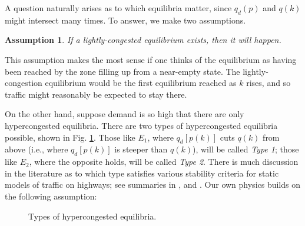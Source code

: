 \documentclass[preprint,authoryear]{elsarticle}
\newtheorem{assumption}{Assumption}
\begin{document}
A question naturally arises as to which equilibria matter, since $q_d(p)$ and $q(k)$ might intersect many times. To answer, we make two assumptions.
\begin{assumption}\label{ass:light-congestion}
If a lightly-congested equilibrium exists, then it will happen.
\end{assumption}
This assumption makes the most sense if one thinks of the equilibrium as having been reached by the zone filling up from a near-empty state. The lightly-congestion equilibrium would be the first equilibrium reached as $k$ rises, and so traffic might reasonably be expected to stay there.

On the other hand, suppose demand is so high that there are only hypercongested equilibria. There are two types of hypercongested equilibria possible, shown in Fig. \ref{fig:hypercongestion}. Those like $E_1$, where $q_d[p(k)]$ cuts $q(k)$ from above (i.e., where $q_d[p(k)]$ is steeper than $q(k)$), will be called \emph{Type 1}; those like $E_2$, where the opposite holds, will be called \emph{Type 2}. There is much discussion in the literature as to which type satisfies various stability criteria for static models of traffic on highways; see summaries in \citet{Verhoef1999}, \citet{Verhoef2005} and \citet{SmallChu2003}. Our own physics builds on the following assumption:

\begin{figure}
	\centering
	\caption{Types of hypercongested equilibria.}
	\label{fig:hypercongestion}
\end{figure}
\end{document}
